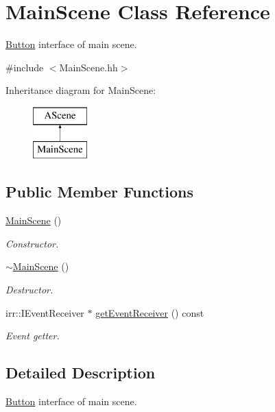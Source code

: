 \hypertarget{classMainScene}{}\section{Main\+Scene Class Reference}
\label{classMainScene}


\hyperlink{classButton}{Button} interface of main scene.  




{\ttfamily \#include $<$Main\+Scene.\+hh$>$}

Inheritance diagram for Main\+Scene\+:\begin{figure}[H]
\begin{center}
\leavevmode
\includegraphics[height=2.000000cm]{classMainScene}
\end{center}
\end{figure}
\subsection*{Public Member Functions}
\begin{DoxyCompactItemize}
\item 
\hyperlink{classMainScene_ad0d02863b2e1eaf96d4d2f9277398afc}{Main\+Scene} ()
\begin{DoxyCompactList}\small\item\em Constructor. \end{DoxyCompactList}\item 
\hyperlink{classMainScene_a6f5a9b6606eb0534d828a11881e0a73f}{$\sim$\+Main\+Scene} ()
\begin{DoxyCompactList}\small\item\em Destructor. \end{DoxyCompactList}\item 
irr\+::\+I\+Event\+Receiver $\ast$ \hyperlink{classMainScene_af9fbc6337aa6ff42447c702e91e77237}{get\+Event\+Receiver} () const
\begin{DoxyCompactList}\small\item\em Event getter. \end{DoxyCompactList}\end{DoxyCompactItemize}


\subsection{Detailed Description}
\hyperlink{classButton}{Button} interface of main scene. 

